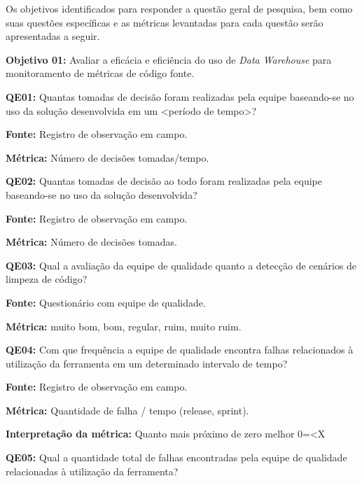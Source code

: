 Os objetivos identificados para responder a questão geral de pesquisa, bem como suas questões específicas e as métricas levantadas para cada questão serão apresentadas a seguir.

\textbf{Objetivo 01:} Avaliar a eficácia e eficiência do uso de \textit{Data Warehouse} para monitoramento de métricas de código fonte. \newline


\textbf{QE01:} Quantas tomadas de decisão foram realizadas pela equipe baseando-se no uso da solução desenvolvida em um <período de tempo>?

\textbf{Fonte:} Registro de observação em campo.

\textbf{Métrica:} Número de decisões tomadas/tempo. \newline


\textbf{QE02: } Quantas tomadas de decisão ao todo foram realizadas pela equipe baseando-se no uso da solução desenvolvida?

\textbf{Fonte:} Registro de observação em campo.

\textbf{Métrica:} Número de decisões tomadas. \newline



\textbf{QE03: } Qual a avaliação da equipe de qualidade quanto a detecção de cenários de limpeza de código?

\textbf{Fonte:} Questionário com equipe de qualidade.

\textbf{Métrica:} muito bom, bom, regular, ruim, muito ruim. \newline


\textbf{QE04: } Com que frequência a equipe de qualidade encontra falhas relacionados à utilização da ferramenta em um determinado intervalo de tempo?

\textbf{Fonte:} Registro de observação em campo.

\textbf{Métrica:} Quantidade de falha / tempo (release, sprint).

\textbf{Interpretação da métrica:} Quanto mais próximo de zero melhor 0=<X \newline


\textbf{QE05: } Qual a quantidade total de falhas encontradas pela equipe de qualidade relacionadas à utilização da ferramenta?

